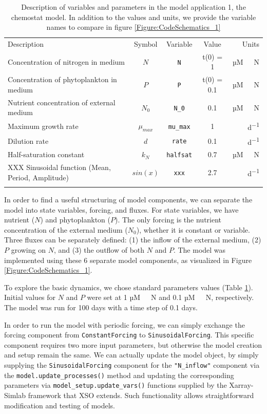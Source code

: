 \documentclass[journal abbreviation, manuscript]{copernicus}
\begin{document}
%
\begin{table}[t]
\caption{Description of variables and parameters in the model application 1, the chemostat model. In addition to the values and units, we provide the variable names to compare in figure \ref{Figure:CodeSchematics_1}}
\begin{tabular}{l c c c r}
\tophline
Description & Symbol & Variable & Value & Units \\
\middlehline

Concentration of nitrogen in medium & $N$ & \texttt{N} & t(0) = 1 & \unit{µM \ N} \\
Concentration of phytoplankton in medium & $P$ & \texttt{P} & t(0) = 0.1 & \unit{µM \ N} \\
Nutrient concentration of external medium & $N_0$ & \texttt{N\_0} & 0.1 & \unit{µM \ N} \\
Maximum growth rate & $\mu_{max}$ & \texttt{mu\_max} & 1 & \unit{d^{-1}} \\
Dilution rate & $d$ & \texttt{rate} & 0.1 & \unit{d^{-1}}\\
Half-saturation constant &  $k_N$ & \texttt{halfsat} & 0.7 & \unit{µM \ N}\\

XXX Sinusoidal function (Mean, Period, Amplitude) &  $sin(x)$ & \texttt{xxx} & 2.7 & \unit{d^{-1}}\\

\bottomhline
\end{tabular}
\label{Table:UseCase1Parameters}
\end{table}
%

In order to find a useful structuring of model components, we can separate the model into state variables, forcing, and fluxes. For state variables, we have nutrient ($N$) and phytoplankton ($P$). The only forcing is the nutrient concentration of the external medium ($N_0$), whether it is constant or variable. Three fluxes can be separately defined: (1) the inflow of the external medium, (2) $P$ growing on $N$, and (3) the outflow of both $N$ and $P$. The model was implemented using these 6 separate model components, as visualized in Figure \ref{Figure:CodeSchematics_1}.

To explore the basic dynamics, we chose standard parameters values (Table \ref{Table:UseCase1Parameters}). Initial values for $N$ and $P$ were set at 1 \unit{µM \ N} and 0.1 \unit{µM \ N}, respectively. The model was run for 100 days with a time step of 0.1 days.

In order to run the model with periodic forcing, we can simply exchange the forcing component from \texttt{ConstantForcing} to \texttt{SinusoidalForcing}. This specific component requires two more input parameters, but otherwise the model creation and setup remain the same. We can actually update the model object, by simply supplying the \texttt{SinusoidalForcing} component for the \texttt{"N\_inflow"} component via the \texttt{model.update\_processes()} method and updating the corresponding parameters via \texttt{model\_setup.update\_vars()} functions supplied by the Xarray-Simlab framework that XSO extends. Such functionality allows straightforward modification and testing of models.
\end{document}
